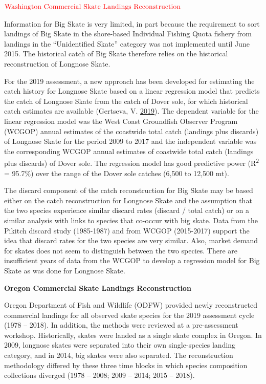 \documentclass[12pt,]{article}
\begin{document}
\textbf{\(\color{red}{\text{Washington Commercial Skate Landings Reconstruction}}\)}

Information for Big Skate is very limited, in part because the
requirement to sort landings of Big Skate in the shore-based Individual
Fishing Quota fishery from landings in the ``Unidentified Skate''
category was not implemented until June 2015. The historical catch of
Big Skate therefore relies on the historical reconstruction of Longnose
Skate.

For the 2019 assessment, a new approach has been developed for
estimating the catch history for Longnose Skate based on a linear
regression model that predicts the catch of Longnose Skate from the
catch of Dover sole, for which historical catch estimates are available
(Gertseva, V. \protect\hyperlink{ref-Gertseva2019}{2019}). The dependent
variable for the linear regression model was the West Coast Groundfish
Observer Program (WCGOP) annual estimates of the coastwide total catch
(landings plus discards) of Longnose Skate for the period 2009 to 2017
and the independent variable was the corresponding WCGOP annual
estimates of coastwide total catch (landings plus discards) of Dover
sole. The regression model has good predictive power
(R\textsuperscript{2} = 95.7\%) over the range of the Dover sole catches
(6,500 to 12,500 mt).

The discard component of the catch reconstruction for Big Skate may be
based either on the catch reconstruction for Longnose Skate and the
assumption that the two species experience similar discard rates
(discard / total catch) or on a similar analysis with links to species
that co-occur with big skate. Data from the Pikitch discard study
(1985-1987) and from WCGOP (2015-2017) support the idea that discard
rates for the two species are very similar. Also, market demand for
skates does not seem to distinguish between the two species. There are
insufficient years of data from the WCGOP to develop a regression model
for Big Skate as was done for Longnose Skate.

\textbf{Oregon Commercial Skate Landings Reconstruction}

Oregon Department of Fish and Wildlife (ODFW) provided newly
reconstructed commercial landings for all observed skate species for the
2019 assessment cycle (1978 -- 2018). In addition, the methods were
reviewed at a pre-assessment workshop. Historically, skates were landed
as a single skate complex in Oregon. In 2009, longnose skates were
separated into their own single-species landing category, and in 2014,
big skates were also separated. The reconstruction methodology differed
by these three time blocks in which species composition collections
diverged (1978 -- 2008; 2009 -- 2014; 2015 -- 2018).
\end{document}
